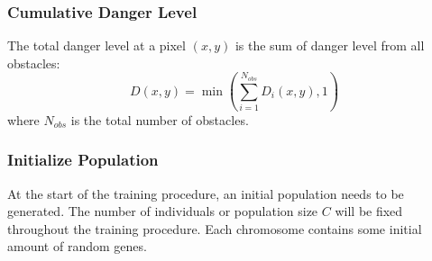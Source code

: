     \subsubsection*{Cumulative Danger Level}
    
    The total danger level at a pixel $(x, y)$ is the sum of danger level from all obstacles:
    $$D(x, y) = \min\left(\sum_{i=1}^{N_{obs}} D_i(x, y), 1\right)$$
    where $N_{obs}$ is the total number of obstacles.


  \subsubsection{Initialize Population}
  At the start of the training procedure, an initial population needs to be generated.
  The number of individuals or population size $C$ will be fixed throughout the training procedure.
Each chromosome contains some initial amount of random genes.


